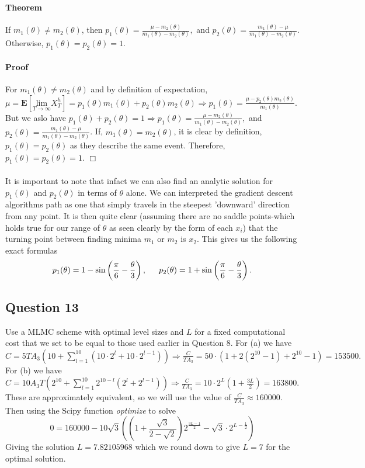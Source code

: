 \documentclass{article}
\begin{document}
\paragraph{Theorem} If $m_1(\theta) \ne m_2(\theta)$, then $p_1(\theta)=\frac{\mu - m_2(\theta)}{m_1(\theta)-m_2(\theta)},$ and $p_2(\theta)= \frac{m_1(\theta)-\mu}{m_1(\theta)-m_2(\theta)}$. Otherwise, $p_1(\theta)=p_2(\theta)=1$.
\paragraph{Proof} For $m_1(\theta) \ne m_2(\theta)$ and by definition of expectation, $\mu = \textbf{E}\left[ \underset{T \to \infty}{\text{lim}} X_T^h \right]=p_1(\theta) m_1(\theta)+ p_2(\theta)m_2(\theta) \Rightarrow p_1(\theta)= \frac{\mu-p_2(\theta)m_2(\theta)}{m_1(\theta)}$. But we aslo have $p_1(\theta)+p_2(\theta)=1 \Rightarrow p_1(\theta)=\frac{\mu - m_2(\theta)}{m_1(\theta)-m_2(\theta)},$ and $p_2(\theta)= \frac{m_1(\theta)-\mu}{m_1(\theta)-m_2(\theta)}$. If, $m_1(\theta)=m_2(\theta)$, it is clear by definition, $p_1(\theta)=p_2(\theta)$ as they describe the same event. Therefore, $p_1(\theta)=p_2(\theta)=1$.   \indent $\Box$
\\
\\
It is important to note that infact we can also find an analytic solution for $p_1(\theta)$ and $p_2(\theta)$ in terms of $\theta$ alone. We can interpreted the gradient descent algorithms path as one that simply travels in the steepest 'downward' direction from any point. It is then quite clear (assuming there are no saddle points-which holds true for our range of $\theta$ as seen clearly by the form of each $x_i$) that the turning point between finding minima $m_1$ or $m_2$ is $x_2$. This gives us the following exact formulas
\begin{equation}
p_1(\theta)=1-\sin \left( \frac{\pi}{6}-\frac{\theta}{3} \right), \indent p_2(\theta)=1+\sin \left(\frac{\pi}{6}-\frac{\theta}{3} \right).
\end{equation}

\subsection{Question 13}
Use a MLMC scheme with optimal level sizes and $L$ for a fixed computational cost that we set to be equal to those used earlier in Question 8. For (a) we have $C= 5 T A_3 (10+\sum_{l=1}^{10} (10 \cdot 2^{l}+ 10 \cdot 2^{l-1})) \Rightarrow \frac{C}{TA_3} = 50 \cdot (1+2({2^{10}-1})+{2^{10}-1})=153500.$ For (b) we have $C=10A_3 T (2^{10}+\sum_{l=1}^{10} 2^{10-l}(2^l+2^{l-1})) \Rightarrow \frac{C}{TA_3}=10 \cdot 2^L (1+\frac{3L}{2})=163800.$ These are approximately equivalent, so we will use the value of $\frac{C}{TA_3}\approx160000$. Then using the Scipy function \textit{optimize} to solve
\begin{equation*}
0=160000-10\sqrt{3} \left( \left(1+\frac{\sqrt{3}}{{2-\sqrt{2}}} \right)2^{\frac{3L-1}{2}}-\sqrt{3} \cdot 2^{L-\frac{1}{2}} \right)
\end{equation*}
Giving the solution $L=7.82105968$ which we round down to give $L=7$ for the optimal solution.
\end{document}
